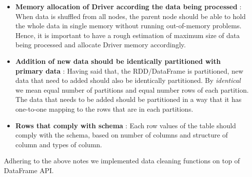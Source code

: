 \begin{itemize}
\item \textbf{Memory allocation of Driver according the data being processed} : When data is shuffled from all nodes, the parent node should be able to hold the whole data in single memory without running out-of-memory problems. Hence, it is important to have a rough estimation of maximum size of data being processed and allocate Driver memory accordingly. 
\item \textbf{Addition of new data should be identically partitioned with primary data} :  Having said that, the RDD/DataFrame is partitioned, new data that need to added should also be identically partitioned. By \textit{identical} we mean equal number of partitions and equal number rows of each partition. The data that needs to be added should be partitioned in a way that it has one-to-one mapping to the rows that are in each partitions. 
\item \textbf{Rows that comply with schema} : Each row values of the table should comply with the schema, based on number of columns and structure of column and types of column.
\end{itemize}
Adhering to the above notes we implemented data cleaning functions on top of DataFrame API. 
